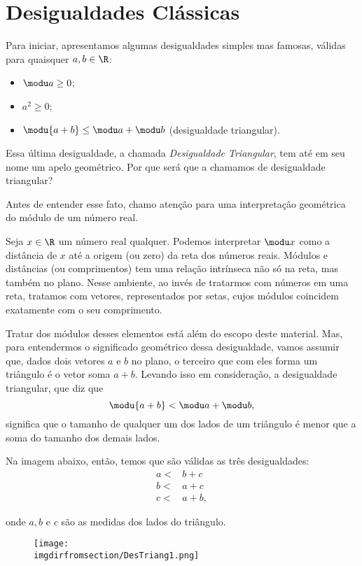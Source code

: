\section{Desigualdades Clássicas}

Para iniciar, apresentamos algumas desigualdades simples mas famosas, válidas para quaisquer $a,b \in \R$:
\begin{itemize}
  \item $\modu a \ge 0$;
  \item $a^2 \ge 0$;
  \item $\modu {a+b} \le \modu a + \modu b$ (desigualdade triangular).
\end{itemize}

Essa última desigualdade, a chamada \emph{Desigualdade Triangular}, tem até em seu nome um apelo geométrico. Por que será que a chamamos de desigualdade triangular?

Antes de entender esse fato, chamo atenção para uma interpretação geométrica do módulo de um número real. 

Seja $x\in \R$ um número real qualquer. Podemos interpretar $\modu x$ como a distância de $x$ até a origem (ou zero) da reta dos números reais. Módulos e distâncias (ou comprimentos) tem uma relação intrínseca não só na reta, mas também no plano. Nesse ambiente, ao invés de tratarmos com números em uma reta, tratamos com vetores, representados por setas, cujos módulos coincidem exatamente com o seu comprimento. 

Tratar dos módulos desses elementos está além do escopo deste material. Mas, para entendermos o significado geométrico dessa desigualdade, vamos assumir que, dados dois vetores $a$ e $b$ no plano, o terceiro que com eles forma um triângulo é o vetor soma $a+b$. Levando isso em consideração, a desigualdade triangular, que diz que $$\modu {a+b} < \modu a +\modu b,$$ significa que o tamanho de qualquer um dos lados de um triângulo é menor que a soma do tamanho dos demais lados.

Na imagem abaixo, então, temos que são válidas as três desigualdades:
\begin{align*}
	a <  & b+c \\
    b <  & a+c \\
    c <  & a+b, 
\end{align*}

onde $a, b$ e $c$ são as medidas dos lados do triângulo.

\label{fig:destri1}
\begin{figure}[H]
\texttt{[image: \\imgdirfromsection/DesTriang1.png]}
\centering
\end{figure}

